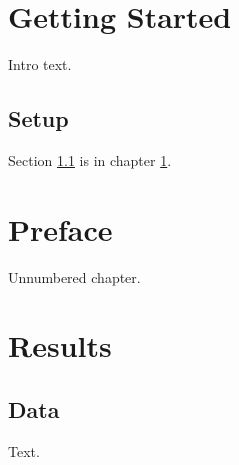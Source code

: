 \documentclass{report}
\begin{document}
\chapter{Getting Started}\label{ch:start}
Intro text.
\section{Setup}\label{sec:setup}
Section \ref{sec:setup} is in chapter \ref{ch:start}.
\chapter*{Preface}
Unnumbered chapter.
\chapter{Results}
\section{Data}
Text.
\end{document}
